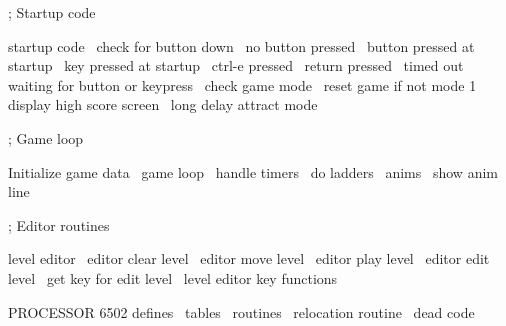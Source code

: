 \documentclass[10pt]{report}%
\begin{document}
    ; Startup code

    \LA{}startup code~{\nwtagstyle{}}\RA{}
    \LA{}check for button down~{\nwtagstyle{}}\RA{}
    \LA{}no button pressed~{\nwtagstyle{}}\RA{}
    \LA{}button pressed at startup~{\nwtagstyle{}}\RA{}
    \LA{}key pressed at startup~{\nwtagstyle{}}\RA{}
    \LA{}ctrl-e pressed~{\nwtagstyle{}}\RA{}
    \LA{}return pressed~{\nwtagstyle{}}\RA{}
    \LA{}timed out waiting for button or keypress~{\nwtagstyle{}}\RA{}
    \LA{}check game mode~{\nwtagstyle{}}\RA{}
    \LA{}reset game if not mode 1~{\nwtagstyle{}}\RA{}
    \LA{}display high score screen~{\nwtagstyle{}}\RA{}
    \LA{}long delay attract mode~{\nwtagstyle{}}\RA{}

    ; Game loop

    \LA{}Initialize game data~{\nwtagstyle{}}\RA{}
    \LA{}game loop~{\nwtagstyle{}}\RA{}
    \LA{}handle timers~{\nwtagstyle{}}\RA{}
    \LA{}do ladders~{\nwtagstyle{}}\RA{}
    \LA{}anims~{\nwtagstyle{}}\RA{}
    \LA{}show anim line~{\nwtagstyle{}}\RA{}

    ; Editor routines

    \LA{}level editor~{\nwtagstyle{}}\RA{}
    \LA{}editor clear level~{\nwtagstyle{}}\RA{}
    \LA{}editor move level~{\nwtagstyle{}}\RA{}
    \LA{}editor play level~{\nwtagstyle{}}\RA{}
    \LA{}editor edit level~{\nwtagstyle{}}\RA{}
    \LA{}get key for edit level~{\nwtagstyle{}}\RA{}
    \LA{}level editor key functions~{\nwtagstyle{}}\RA{}
\nwendcode{}\nwdocspar

\nwenddocs{}\endmoddef\nwstartdeflinemarkup\nwenddeflinemarkup
    PROCESSOR 6502
    \LA{}defines~{\nwtagstyle{}}\RA{}
    \LA{}tables~{\nwtagstyle{}}\RA{}
    \LA{}routines~{\nwtagstyle{}}\RA{}
    \LA{}relocation routine~{\nwtagstyle{}}\RA{}
    \LA{}dead code~{\nwtagstyle{}}\RA{}
\nwnotused{*}\nwendcode{}\nwdocspar
\end{document}
